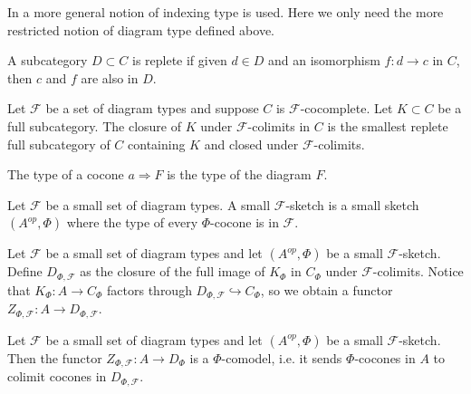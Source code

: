 \begin{remark}
  In \cite{kelly/basic-concepts-enriched} a more general notion of indexing
  type is used. Here we only need the more restricted notion of diagram type
  defined above.
\end{remark}

\begin{definition}

  \noindent A subcategory $D\subset C$ is replete if given $d\in D$ and an
  isomorphism $f:d\to c$ in $C$, then $c$ and $f$ are also in $D$.
\end{definition}


\begin{definition}

  \noindent Let $\mathcal{F}$ be a set of diagram types and suppose $C$ is
  $\mathcal{F}$-cocomplete. Let $K\subset C$ be a full subcategory. The
  closure of $K$ under $\mathcal{F}$-colimits in $C$ is the smallest replete
  full subcategory of $C$ containing $K$ and closed under
  $\mathcal{F}$-colimits.
\end{definition}

\begin{definition}

  \noindent The type of a cocone $a\Rightarrow F$ is the type of the diagram
  $F$.
\end{definition}

\begin{definition}

  \noindent Let $\mathcal{F}$ be a small set of diagram types. A small
  $\mathcal{F}$-sketch is a small sketch $(A^{op},\Phi)$ where the type of
  every $\Phi$-cocone is in $\mathcal{F}$.
\end{definition}


\begin{definition}

  \noindent Let $\mathcal{F}$ be a small set of diagram types and let
  $(A^{op},\Phi)$ be a small $\mathcal{F}$-sketch. Define
  $D_{\Phi,\mathcal{F}}$ as the closure of the full image of $K_{\Phi}$ in
  $C_{\Phi}$ under $\mathcal{F}$-colimits. Notice that $K_{\Phi}:A\to
  C_{\Phi}$ factors through $D_{\Phi,\mathcal{F}}\hookrightarrow C_{\Phi}$, so
  we obtain a functor $Z_{\Phi,\mathcal{F}}:A\to D_{\Phi,\mathcal{F}}$.
\end{definition}

\begin{lemma}
  Let $\mathcal{F}$ be a small set of diagram types and let $(A^{op},\Phi)$ be
  a small $\mathcal{F}$-sketch. Then the functor $Z_{\Phi,\mathcal{F}}:A\to
  D_{\Phi}$ is a $\Phi$-comodel, i.e. it sends $\Phi$-cocones in $A$ to
  colimit cocones in $D_{\Phi,\mathcal{F}}$.
\end{lemma}

